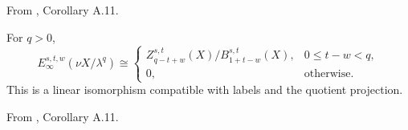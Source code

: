 \begin{proposition}
\label{sem:Literature:infinite-finite-window}
From \cite{BHS}, Corollary A.11.\par

For $q>0$,
\[E_\infty^{s,t,w}(\nu X/\lambda^q)\cong
\begin{cases}Z_{q-t+w}^{s,t}(X)/B_{1+t-w}^{s,t}(X),&0\le t-w<q,\\0,&\text{otherwise}.\end{cases}\]
This is a linear isomorphism compatible with labels and the quotient projection.

From \cite{BHS}, Corollary A.11.\par


\end{proposition}
